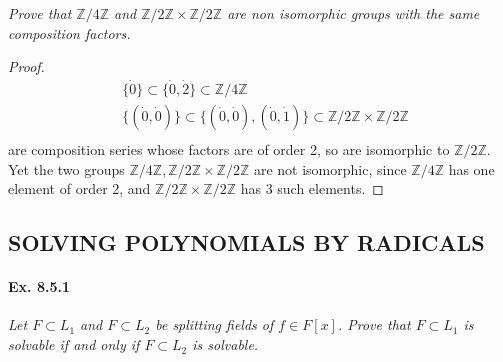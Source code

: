\documentclass[11pt,a4paper]{article}
\newcommand{\Z}{\mathbb{Z}}
\begin{document}
{\it Prove that $\Z/4\Z$ and $\Z/2\Z \times \Z/2\Z$ are non isomorphic groups with the same composition factors.
}

\begin{proof}
\begin{align*}
&\{\dot{0}\} \subset \{\dot{0},\dot{2}\} \subset \Z/4\Z\\
&\{(\dot{0},\dot{0})\} \subset \{(\dot{0},\dot{0}),(\dot{0},\dot{1})\} \subset \Z/2\Z\times \Z/2\Z\\
\end{align*}
are composition series whose factors are of order 2, so  are isomorphic to $\Z/2\Z$. Yet the two groups $\Z/4\Z, \Z/2\Z\times \Z/2\Z$ are not isomorphic, since $\Z/4\Z$ has one element of order 2, and $\Z/2\Z\times \Z/2\Z$ has 3 such elements.
\end{proof}

\subsection{SOLVING POLYNOMIALS BY RADICALS}

\paragraph{Ex. 8.5.1}

{\it Let $F \subset L_1$ and $F \subset L_2$ be splitting fields of $f \in F[x]$. Prove that $F\subset L_1$ is solvable if and only if $F\subset L_2$ is solvable.
}
\end{document}

